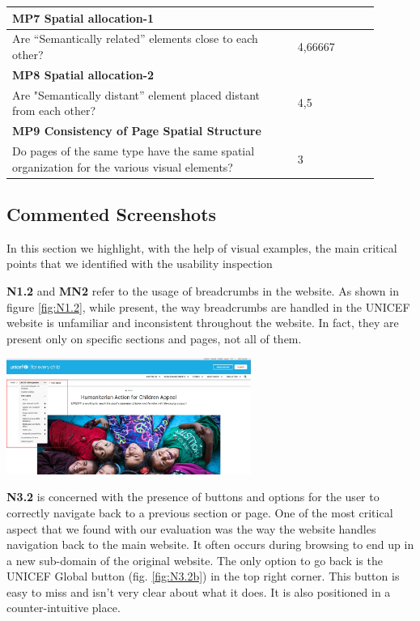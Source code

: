 \begin{longtable}{|p{0.7\linewidth}|p{0.2\linewidth}|}
\multicolumn{2}{|l|}{\textbf{MP7 Spatial allocation-1}} \\
\hline
Are “Semantically related” elements close to each other? & 4,66667  \\
\hline

\multicolumn{2}{|l|}{\textbf{MP8 Spatial allocation-2}} \\
\hline
Are "Semantically distant” element placed distant from each other? & 4,5  \\
\hline

\multicolumn{2}{|l|}{\textbf{MP9 Consistency of Page Spatial Structure}} \\
\hline
Do pages of the same type have the same spatial organization for the various visual elements? & 3  \\
\hline

\end{longtable}

\subsection{Commented Screenshots}
In this section we highlight, with the help of visual examples, the main critical points that we identified with the usability inspection

\textbf{N1.2} and \textbf{MN2} refer to the usage of breadcrumbs in the website. As shown in figure \ref{fig:N1.2}, while present, the way breadcrumbs are handled in the UNICEF website is unfamiliar and
inconsistent throughout the website. In fact, they are present only on specific sections and pages, not all of them.

\begin{center}
    \includegraphics[width=0.6\textwidth]{img/critical_heuristics/MN2.png}
     \label{fig:N1.2}
\end{center}

\vspace{1em}

\textbf{N3.2} is concerned with the presence of buttons and options for the user to correctly navigate back to a previous section or page. One of the most critical aspect that we found with our evaluation was the way
the website handles navigation back to the main website. It often occurs during browsing to end up in a new sub-domain of the original website. The only option to go back is the UNICEF Global button (fig. \ref{fig:N3.2b}) in the top right corner.
This button is easy to miss and isn't very clear about what it does. It is also positioned in a counter-intuitive place.


